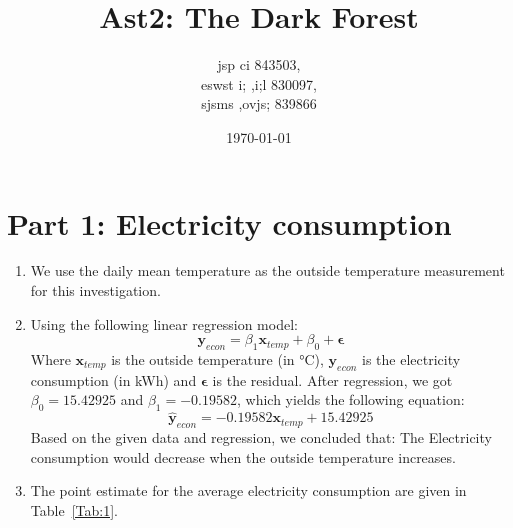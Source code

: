 \documentclass[12pt]{article}
\title{Ast2: The Dark Forest}
\author{jsp ci 843503,\\ 
	eswst i; ,i;l 830097,\\ 
sjsms ,ovjs; 839866}
\date{\today}
\begin{document}
	
\maketitle

\section{Part 1: Electricity consumption}

\begin{enumerate}
	\item We use the daily mean temperature as the outside temperature measurement for this investigation.
	\item Using the following linear regression model:
\[
\mathbf{y}_{econ} = \beta_1 \mathbf{x}_{temp} + \beta_0 + \mathbf{\epsilon}
\] 
Where $\mathbf{x}_{temp}$ is the outside temperature (in °C), $\mathbf{y}_{econ}$ is the electricity consumption (in kWh) and $\mathbf{\epsilon}$ is the residual. After regression, we got $\beta_0 = 15.42925$ and $\beta_1 = -0.19582$, which yields the following equation:
\[
\hat{\mathbf{y}}_{econ} = -0.19582 \mathbf{x}_{temp} + 15.42925
\] 
Based on the given data and regression, we concluded that: 
The Electricity consumption would decrease when the outside temperature increases.
\item The point estimate for the average electricity consumption are given in Table~\ref{Tab:1}.


\end{enumerate}
\end{document}
